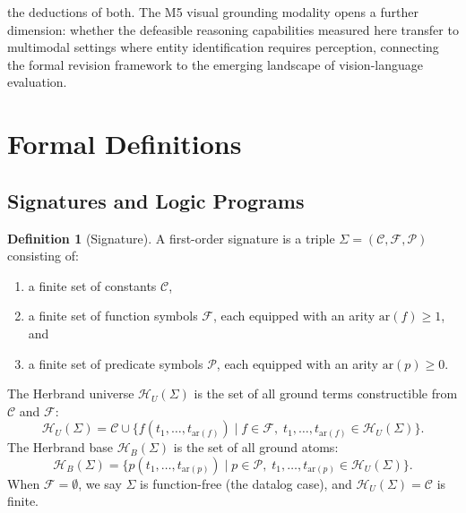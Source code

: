 \documentclass{article}
\theoremstyle{definition}
\newtheorem{definition}[theorem]{Definition}
\newcommand{\HB}{\mathcal{H}_B}
\newcommand{\HU}{\mathcal{H}_U}
\begin{document}
the deductions of both. The M5 visual grounding modality opens a further dimension: whether the defeasible reasoning capabilities measured here transfer to multimodal settings where entity identification requires perception, connecting the formal revision framework to the emerging landscape of vision-language evaluation.





\appendix

\section{Formal Definitions}\label{app:definitions}

\subsection{Signatures and Logic Programs}

\begin{definition}[Signature]\label{def:signature}
A first-order signature is a triple $\Sigma = (\mathcal{C}, \mathcal{F}, \mathcal{P})$ consisting of:
\begin{enumerate}[label=(\roman*)]
    \item a finite set of constants $\mathcal{C}$,
    \item a finite set of function symbols $\mathcal{F}$, each equipped with an arity $\mathrm{ar}(f) \geq 1$, and
    \item a finite set of predicate symbols $\mathcal{P}$, each equipped with an arity $\mathrm{ar}(p) \geq 0$.
\end{enumerate}
The Herbrand universe $\HU(\Sigma)$ is the set of all ground terms constructible from $\mathcal{C}$ and $\mathcal{F}$:
\[
    \HU(\Sigma) = \mathcal{C} \cup \{f(t_1, \ldots, t_{\mathrm{ar}(f)}) \mid f \in \mathcal{F},\; t_1, \ldots, t_{\mathrm{ar}(f)} \in \HU(\Sigma)\}.
\]
The Herbrand base $\HB(\Sigma)$ is the set of all ground atoms:
\[
    \HB(\Sigma) = \{p(t_1, \ldots, t_{\mathrm{ar}(p)}) \mid p \in \mathcal{P},\; t_1, \ldots, t_{\mathrm{ar}(p)} \in \HU(\Sigma)\}.
\]
When $\mathcal{F} = \emptyset$, we say $\Sigma$ is function-free (the datalog case), and $\HU(\Sigma) = \mathcal{C}$ is finite.
\end{definition}
\end{document}

